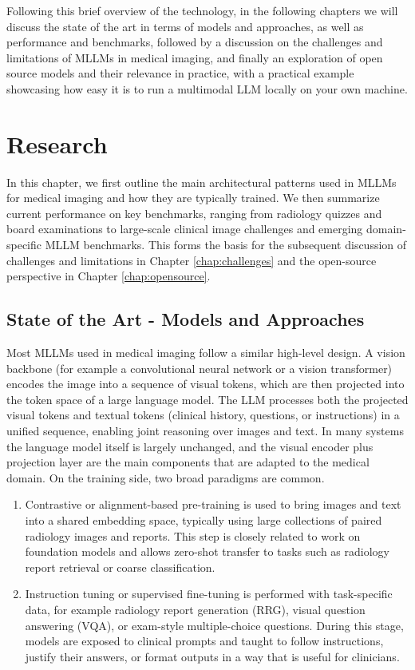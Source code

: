 \documentclass{imc-inf}
\begin{document}
Following this brief overview of the technology, in the following chapters we will discuss the state of the art in terms of models and approaches, as well as performance and benchmarks, followed by a discussion on the challenges and limitations of MLLMs in medical imaging, and finally an exploration of open source models and their relevance in practice, with a practical example showcasing how easy it is to run a multimodal LLM locally on your own machine.

\chapter{Research}\label{chap:research}

In this chapter, we first outline the main architectural patterns used in MLLMs for medical imaging and how they are typically trained.
We then summarize current performance on key benchmarks, ranging from radiology quizzes and board examinations to large-scale clinical image challenges and emerging domain-specific MLLM benchmarks.
This forms the basis for the subsequent discussion of challenges and limitations in Chapter \ref{chap:challenges} and the open-source perspective in Chapter \ref{chap:opensource}.

\section{State of the Art - Models and Approaches}

Most MLLMs used in medical imaging follow a similar high-level design.
A vision backbone (for example a convolutional neural network or a vision transformer) encodes the image into a sequence of visual tokens, which are then projected into the token space of a large language model.
The LLM processes both the projected visual tokens and textual tokens (clinical history, questions, or instructions) in a unified sequence, enabling joint reasoning over images and text.
In many systems the language model itself is largely unchanged, and the visual encoder plus projection layer are the main components that are adapted to the medical domain.
On the training side, two broad paradigms are common.

\begin{enumerate}
    \item Contrastive or alignment-based pre-training is used to bring images and text into a shared embedding space, typically using large collections of paired radiology images and reports. This step is closely related to work on foundation models and allows zero-shot transfer to tasks such as radiology report retrieval or coarse classification.
    \item Instruction tuning or supervised fine-tuning is performed with task-specific data, for example radiology report generation (RRG), visual question answering (VQA), or exam-style multiple-choice questions. During this stage, models are exposed to clinical prompts and taught to follow instructions, justify their answers, or format outputs in a way that is useful for clinicians.
\end{enumerate}
\end{document}
